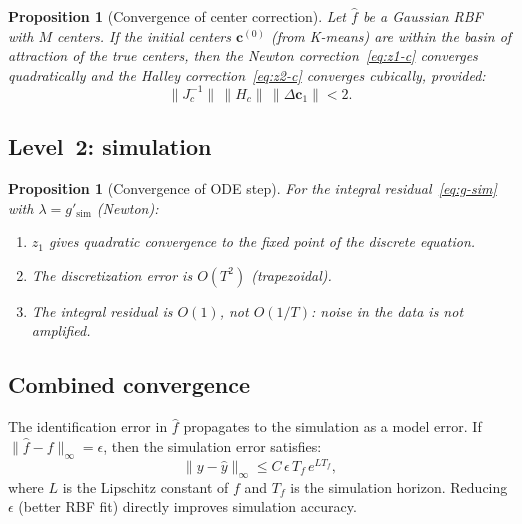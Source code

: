 \documentclass[11pt,a4paper]{article}
\newtheorem{proposition}[theorem]{Proposition}
\begin{document}
\begin{proposition}[Convergence of center correction]\label{prop:conv-centers}
Let $\hat{f}$ be a Gaussian RBF with $M$ centers. If the initial centers $\mathbf{c}^{(0)}$ (from K-means) are within the basin of attraction of the true centers, then the Newton correction~\eqref{eq:z1-c} converges quadratically and the Halley correction~\eqref{eq:z2-c} converges cubically, provided:
\begin{equation}
\|J_c^{-1}\|\,\|H_c\|\,\|\Delta\mathbf{c}_1\| < 2.
\label{eq:conv-cond}
\end{equation}
\end{proposition}

\subsection{Level~2: simulation}

\begin{proposition}[Convergence of ODE step]\label{prop:conv-ode}
For the integral residual~\eqref{eq:g-sim} with $\lambda = g'_{\mathrm{sim}}$ (Newton):
\begin{enumerate}[nosep]
\item[\emph{(i)}] $z_1$ gives quadratic convergence to the fixed point of the discrete equation.
\item[\emph{(ii)}] The discretization error is $O(T^2)$ (trapezoidal).
\item[\emph{(iii)}] The integral residual is $O(1)$, not $O(1/T)$: noise in the data is not amplified.
\end{enumerate}
\end{proposition}

\subsection{Combined convergence}

The identification error in $\hat{f}$ propagates to the simulation as a model error. If $\|\hat{f} - f\|_\infty = \epsilon$, then the simulation error satisfies:
\begin{equation}
\|y - \hat{y}\|_\infty \leq C\,\epsilon\,T_f\,e^{L T_f},
\label{eq:combined-error}
\end{equation}
where $L$ is the Lipschitz constant of $f$ and $T_f$ is the simulation horizon. Reducing $\epsilon$ (better RBF fit) directly improves simulation accuracy.


\end{document}
